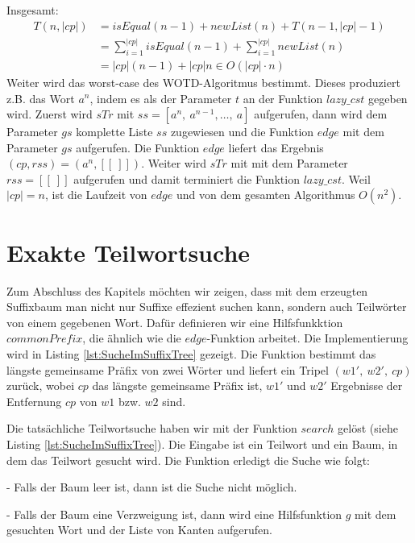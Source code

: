 \documentclass[12pt]{report}
\newcommand{\abs}[1]{\left|#1\right|}
\begin{document}
Insgesamt:
\begin{align*}
    T(n,\abs{cp}) &= isEqual(n - 1) + newList(n) + T(n-1,\abs{cp}-1) \\
                  &= \sum_{i = 1}^{\abs{cp}}{isEqual(n-1)} + \sum_{i = 1}^{\abs{cp}}{newList(n)}\\
                  &= \abs{cp} (n - 1) + \abs{cp} n \in O(\abs{cp} \cdot n)
\end{align*}
Weiter wird das worst-case des WOTD-Algoritmus bestimmt. Dieses produziert z.B. das Wort $a^n$, indem es als der Parameter $t$ an der Funktion $lazy\_cst$ gegeben wird. Zuerst wird $sTr$ mit $ss = [a^n,\:a^{n-1}, \dots ,\:a]$ aufgerufen, dann wird dem Parameter $gs$ komplette Liste $ss$ zugewiesen und die Funktion $edge$ mit dem Parameter $gs$ aufgerufen. Die Funktion $edge$ liefert das Ergebnis $(cp,rss) = (a^n, [[\:]])$. Weiter wird $sTr$ mit mit dem Parameter $rss = [[\:]]$ aufgerufen und damit terminiert die Funktion $lazy\_cst$. Weil $|cp| = n$, ist die Laufzeit von $edge$ und von dem gesamten Algorithmus $O(n^2)$.

\section{Exakte Teilwortsuche}
\label{sec:ExakteTeilwortsuche}

Zum Abschluss des Kapitels möchten wir zeigen, dass mit dem erzeugten Suffixbaum man nicht nur Suffixe effezient suchen kann, sondern auch Teilwörter von einem gegebenen Wort. Dafür definieren wir eine Hilfsfunkktion $commonPrefix$, die ähnlich wie die $edge$-Funktion arbeitet. Die Implementierung wird in Listing \ref{lst:SucheImSuffixTree} gezeigt. Die Funktion bestimmt das längste gemeinsame Präfix von zwei Wörter und liefert ein Tripel $(w1',\: w2',\: cp)$ zurück, wobei $cp$ das längste gemeinsame Präfix ist, $w1'$ und $w2'$ Ergebnisse der Entfernung $cp$ von $w1$ bzw. $w2$ sind.

Die tatsächliche Teilwortsuche haben wir mit der Funktion $search$ gelöst (siehe Listing \ref{lst:SucheImSuffixTree}). Die Eingabe ist ein Teilwort und ein Baum, in dem das Teilwort gesucht wird. Die Funktion erledigt die Suche wie folgt:

    - Falls der Baum leer ist, dann ist die Suche nicht möglich.

    - Falls der Baum eine Verzweigung ist, dann wird eine Hilfsfunktion $g$ mit dem gesuchten Wort und der Liste von Kanten aufgerufen.
\end{document}
